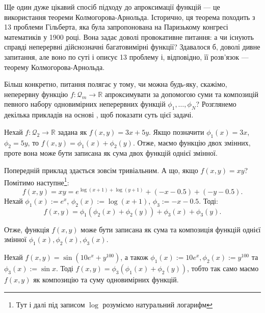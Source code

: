 Ще один дуже цікавий спосіб підходу до апроксимації функцій --- це використання
теореми Колмогорова-Арнольда. Історично, ця теорема походить з 13 проблеми
Гільберта, яка була запропонована на Паризькому конгресі математиків у 1900
році. Вона задає доволі провокативне питання: а чи існують справді неперервні
дійснозначні багатовимірні функції? Здавалося б, доволі дивне запитання, але
воно по суті і описує 13 проблему і, відповідно, її розв'язок --- теорему
Колмогорова-Арнольда. 

Більш конкретно, питання полягає у тому, чи можна будь-яку, скажімо, неперервну
функцію $f: \mathcal{Q}_m \to \mathbb{R}$ апроксимувати за допомогою суми та
композицій певного набору одновимірних неперервних функцій
$\phi_1,\dots,\phi_N$? Розглянемо декілька прикладів на основі
\cite{ka-explained}, щоб показати суть цієї задачі.

\begin{example}
	Нехай $f: \mathcal{Q}_2 \to \mathbb{R}$ задана як $f(x,y) = 3x+5y$. Якщо
	позначити $\phi_1(x)=3x$, $\phi_2=5y$, то $f(x,y) = \phi_1(x)+\phi_2(y)$.
	Отже, маємо функцію двох змінних, проте вона може бути записана як сума двох
	функцій однієї змінної.
\end{example}

\begin{example}
	Попередній приклад здається зовсім тривіальним. А що, якщо $f(x,y)=xy$? Помітимо 
	наступне\footnote{Тут і далі під записом $\log$ розуміємо натуральний логарифм}:
	\begin{equation*}
		f(x,y) = xy = e^{\log (x+1) + \log(y+1)} + \left(-x-0.5\right) + \left(-y-0.5\right).
	\end{equation*}
	Нехай $\phi_1(x) := e^x$, $\phi_2(x) := \log(x+1)$,
	$\phi_3 := -x-0.5$. Тоді:
	\begin{equation*}
		f(x,y) = \phi_1(\phi_2(x)+\phi_2(y)) + \phi_3(x) + \phi_3(y).
	\end{equation*}

	Отже, функція $f(x,y)$ може бути записана як сума та композиція функцій
	однієї змінної $\phi_1(x),\phi_2(x),\phi_3(x)$.
\end{example}

\begin{example}
	Нехай $f(x,y) = \sin (10e^x + y^{100})$, а також $\phi_1(x) := 10e^x,
	\phi_2(x) := y^{100}$ та $\phi_3(x) := \sin x$. Тоді $f(x,y) =
	\phi_3(\phi_1(x)+\phi_2(y))$, тобто так само маємо $f(x,y)$ як композицію та
	суму одновимірних функцій.
\end{example}

